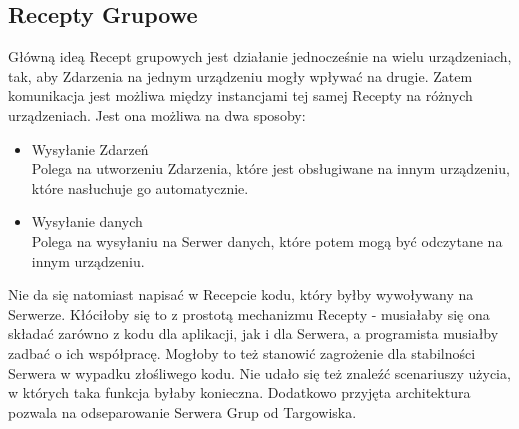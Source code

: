 \documentclass[11pt,a4paper,polish,thesis]{dcsbook}
\begin{document}
\subsection{Recepty Grupowe}
Główną ideą Recept grupowych jest działanie jednocześnie na wielu urządzeniach, tak, aby Zdarzenia na jednym urządzeniu mogły wpływać na drugie. Zatem komunikacja jest możliwa między instancjami  tej samej Recepty na różnych urządzeniach. Jest ona możliwa na dwa sposoby:
\begin{itemize}
\item{Wysyłanie Zdarzeń}\\
Polega na utworzeniu Zdarzenia, które jest obsługiwane na innym urządzeniu, które nasłuchuje go automatycznie.
\item{Wysyłanie danych}\\
Polega na wysyłaniu na Serwer danych, które potem mogą być odczytane na innym urządzeniu.
\end{itemize}
Nie da się natomiast napisać w Recepcie kodu, który byłby wywoływany na Serwerze. Kłóciłoby się to z prostotą mechanizmu Recepty - musiałaby się ona składać zarówno z kodu dla aplikacji, jak i dla Serwera, a programista musiałby zadbać o ich współpracę. Mogłoby to też stanowić zagrożenie dla stabilności Serwera w wypadku złośliwego kodu.
Nie udało się też znaleźć scenariuszy użycia, w których taka funkcja byłaby konieczna. Dodatkowo przyjęta architektura pozwala na odseparowanie Serwera Grup od Targowiska. 
\end{document}
